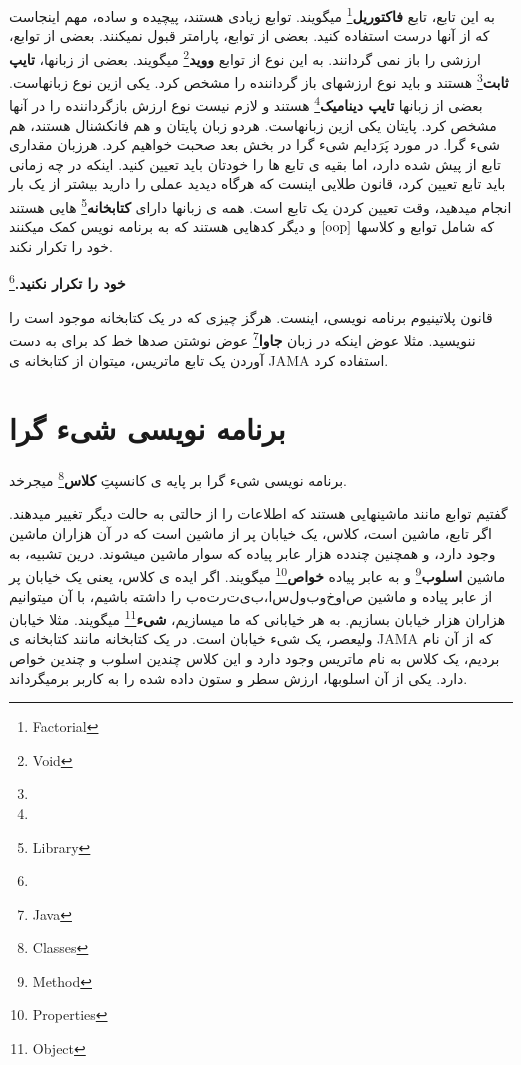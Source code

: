 \documentclass[14pt,a4paper]{memoir}
\begin{document}
به این تابع، تابع \textbf{فاکتوریل}\footnote{Factorial} میگویند. توابع زیادی هستند، پیچیده و ساده، مهم اینجاست که از آنها درست استفاده کنید. 
بعضی از توابع، پارامتر قبول نمیکنند. بعضی از توابع، ارزشی را باز نمی گردانند. به این نوع از توابع \textbf{ووید}\footnote{Void} میگویند. بعضی از زبانها، \textbf{تایپ ثابت}\footnote{} هستند و باید نوع ارزشهای باز گرداننده را مشخص کرد.  یکی ازین نوع زبانهاست. بعضی از زبانها \textbf{تایپ دینامیک}\footnote{} هستند و لازم نیست نوع ارزش بازگرداننده را در آنها مشخص کرد. پایتان یکی ازین زبانهاست. هردو زبان پایتان و  هم فانکشنال هستند، هم شیء گرا. در مورد پَرَدایم شیء گرا در بخش بعد صحبت خواهیم کرد. 
هرزبان مقداری تابع از پیش  شده دارد، اما بقیه ی تابع ها را خودتان باید تعیین کنید. اینکه در چه زمانی باید تابع تعیین کرد، قانون طلایی اینست که هرگاه دیدید عملی را دارید بیشتر از یک بار انجام میدهید، وقت تعیین کردن یک تابع است. 
همه ی زبانها دارای \textbf{کتابخانه}\footnote{Library} هایی هستند که شامل توابع و کلاسها \(\ref{oop}\) و دیگر کدهایی هستند که به برنامه نویس کمک میکنند خود را تکرار نکند.
 
	 
	\textbf{خود را تکرار نکنید.}\footnote{}
	
	قانون پلاتینیوم برنامه نویسی، اینست. هرگز چیزی که در یک کتابخانه موجود است را ننویسید. مثلا عوض اینکه در زبان \textbf{جاوا}\footnote{Java} عوض نوشتن صدها خط کد برای به دست آوردن یک تابع ماتریس، میتوان از کتابخانه ی JAMA استفاده کرد.
	
	
	
	
	
	
	 
	 \section{برنامه نویسی شیء گرا}\label{oop}
	 
	 
	 برنامه نویسی شیء گرا بر پایه ی کانسپتِ \textbf{کلاس}\footnote{Classes} میجرخد.
	 
	 گفتیم توابع مانند ماشینهایی هستند که اطلاعات را از حالتی به حالت دیگر تغییر میدهند. اگر تابع، ماشین است، کلاس، یک خیابان پر از ماشین است که در آن هزاران ماشین وجود دارد، و همچنین چندده هزار عابر پیاده که سوار ماشین میشوند. درین تشبیه، به ماشین \textbf{اسلوب}\footnote{Method} و به عابر پیاده \textbf{خواص}\footnote{Properties} میگویند. اگر ایده ی کلاس، یعنی یک خیابان پر از عابر پیاده و ماشین \(به ترتیب، اسلوب و خواص\) را داشته باشیم، با آن میتوانیم هزاران هزار خیابان بسازیم. به هر خیابانی که ما میسازیم، \textbf{شیء}\footnote{Object} میگویند. مثلا خیابان ولیعصر، یک شیء خیابان است. در یک کتابخانه مانند کتابخانه ی JAMA که از آن نام بردیم، یک کلاس به نام ماتریس وجود دارد و این کلاس چندین اسلوب و چندین خواص دارد. یکی از آن اسلوبها، ارزش سطر و ستون داده شده را به کاربر برمیگرداند.
	 
\end{document}
